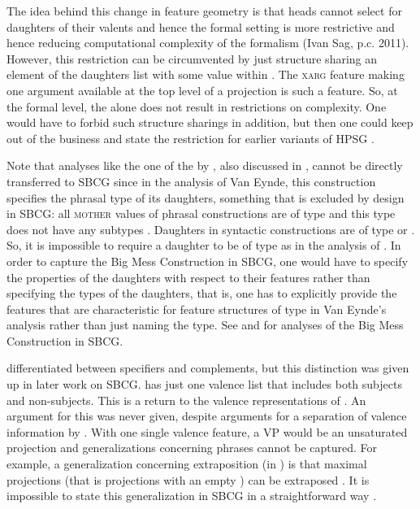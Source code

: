 \documentclass[output=paper,biblatex,babelshorthands,newtxmath,draftmode,colorlinks,citecolor=brown]{langscibook}
\begin{document}
\z
The idea behind this change in feature geometry is that heads cannot select for daughters of their valents and hence
the formal setting is more restrictive and hence reducing computational complexity of the formalism (Ivan Sag,
p.c. 2011). However, this restriction can be circumvented by just structure sharing an element of
the daughters list with some value within \mother. The \textsc{xarg} feature making one argument
available at the top level of a projection \citep{BF99a} is such a feature. So, at the formal level, the \motherf alone does not
result in restrictions on complexity. One would have to forbid such structure sharings in addition,
but then one could keep \mother out of the business and state the restriction for earlier variants
of HPSG \citep[Section~10.6.2.1.3]{MuellerGT-Eng2}.

Note that analyses like the one of the  by \citet[]{VanEynde2018a-u}, also discussed in \crossrefchapterw[\page \pageref{bigmess2}]{np}, cannot be
directly transferred to SBCG since in the analysis of Van Eynde, this construction specifies the
phrasal type of its daughters, something that is excluded by design in SBCG: all \textsc{mother} values of
phrasal constructions are of type  and this type does not have any subtypes
\citep[]{Sag2012a}. Daughters in syntactic constructions are of type  or
. So, it is impossible to require a daughter to be of type
 as in the analysis of \citeauthor{VanEynde2018a-u}. In order to
capture the Big Mess Construction in SBCG, one would have to specify the properties of the daughters
with respect to their features rather than specifying the types of the daughters, that is, one has
to explicitly provide the features that are characteristic for feature structures of type
 in Van Eynde's analysis rather than just naming the type. See
\citet{KS2012a-u} and \citet{KS2011a-u} for analyses of the Big Mess Construction in SBCG.


\citet*{SWB2003a} differentiated between specifiers and complements, but this distinction was given up
in later work on SBCG. \citet{Sag2012a} has just one valence list that includes both subjects and
non-subjects. This is a return to the valence representations of \citet{ps}. An argument for this
was never given, despite arguments for a separation of valence information by \citet{Borsley87a}. With one single valence feature, a VP would be an unsaturated projection and generalizations
concerning phrases cannot be captured. For example, a generalization concerning extraposition (in
) is that maximal projections (that is projections with an empty \compsl) can be
extraposed \citep[Section~13.1.2]{Mueller99a}. It is impossible to state this generalization in SBCG
in a straightforward way \citep[Section~10.6.2.3]{MuellerGT-Eng2}.
\end{document}
